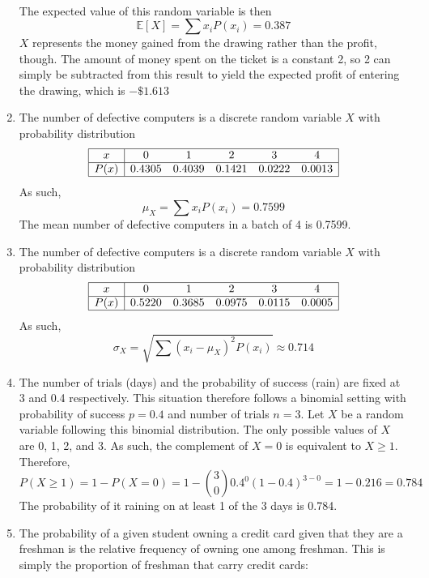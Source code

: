 \documentclass[12pt]{article}
\newcommand{\Exp}{\mathbb{E}}
\begin{document}
\begin{enumerate}
\[\begin{array}{|c|*{2}{c}|}
					\end{array}\]
					The expected value of this random variable is then
					\[
						\Exp[X] = \sum x_iP(x_i)
							= 0.387
					\]
					\(X\) represents the money gained from the drawing rather than the profit, though. The amount of money spent on the ticket is a constant 2, so 2 can simply be subtracted from this result to yield the expected profit of entering the drawing, which is \(-\$1.613\)
			\item
				The number of defective computers is a discrete random variable \(X\) with probability distribution
					\[\begin{array}{|c|*{5}{c}|}\hline
						x & 0 & 1 & 2 & 3 & 4 \\\hline
						P(x) & 0.4305 & 0.4039 & 0.1421 & 0.0222 & 0.0013 \\\hline
					\end{array}\]
					As such,
					\[
						\mu_X = \sum x_iP(x_i)
							= 0.7599
					\]
					The mean number of defective computers in a batch of 4 is 0.7599.
			\item
				The number of defective computers is a discrete random variable \(X\) with probability distribution
					\[\begin{array}{|c|*{5}{c}|}\hline
						x & 0 & 1 & 2 & 3 & 4 \\\hline
						P(x) & 0.5220 & 0.3685 & 0.0975 & 0.0115 & 0.0005\\\hline
					\end{array}\]
					As such,
					\[
						\sigma_X = \sqrt{\sum(x_i - \mu_X)^2P(x_i)}
							\approx 0.714
					\]
			\item
				The number of trials (days) and the probability of success (rain) are fixed at 3 and 0.4 respectively. This situation therefore follows a binomial setting with probability of success \(p = 0.4\) and number of trials \(n = 3\). Let \(X\) be a random variable following this binomial distribution. The only possible values of \(X\) are 0, 1, 2, and 3. As such, the complement of \(X = 0\) is equivalent to \(X \ge 1\). Therefore,
					\[
						P(X \ge 1) = 1 - P(X = 0)
							= 1 - \binom{3}{0}0.4^0(1 - 0.4)^{3 - 0}
							= 1 - 0.216
							= 0.784 
					\]
					The probability of it raining on at least 1 of the 3 days is 0.784.
			\item
				The probability of a given student owning a credit card given that they are a freshman is the relative frequency of owning one among freshman. This is simply the proportion of freshman that carry credit cards:
					\begin{align*}

\end{align*}
\end{enumerate}
\end{document}
